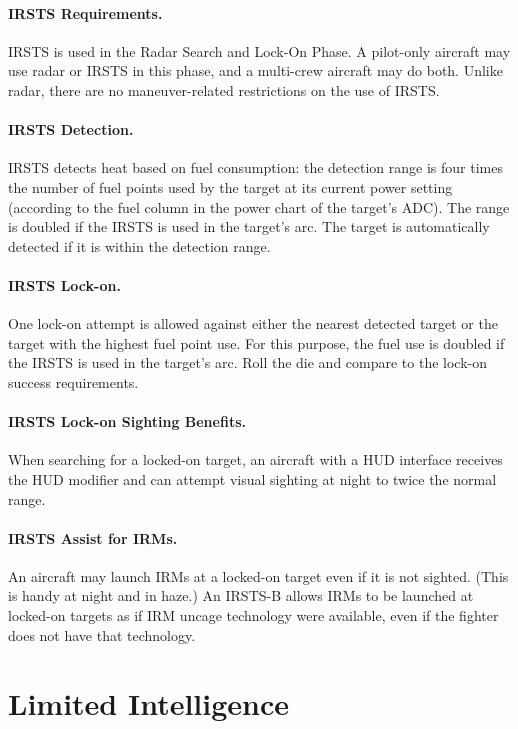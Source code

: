 \begin{advancedrules}
{\paragraph{IRSTS Requirements.}  IRSTS is used in the Radar Search and Lock-On Phase. A pilot-only aircraft may use radar or IRSTS in this phase, and a multi-crew aircraft may do both. Unlike radar, there are no maneuver-related restrictions on the use of IRSTS.

\paragraph{IRSTS Detection.} IRSTS detects heat based on fuel consumption: the detection range is four times the number of fuel points used by the target at its current power setting (according to the fuel column in the power chart of the target’s ADC). The range is doubled if the IRSTS is used in the target’s  arc. The target is automatically detected if it is within the detection range.

\paragraph{IRSTS Lock-on.} One lock-on attempt is allowed against either the nearest detected target or the target with the highest fuel point use. For this purpose, the fuel use is doubled if the IRSTS is used in the target’s  arc. Roll the die and compare to the lock-on success requirements.

\paragraph{IRSTS Lock-on Sighting Benefits.} When searching for a locked-on target, an aircraft with a HUD interface receives the HUD modifier and can attempt visual sighting at night to twice the normal range.

\paragraph{IRSTS Assist for IRMs.} An aircraft may launch IRMs at a locked-on target even if it is not sighted. (This is handy at night and in haze.) An IRSTS-B allows IRMs to be launched at locked-on targets as if IRM uncage technology were available, even if the fighter does not have that technology.

}

\section{Limited Intelligence}
\label{rule:limited-intelligence}


\end{advancedrules}
